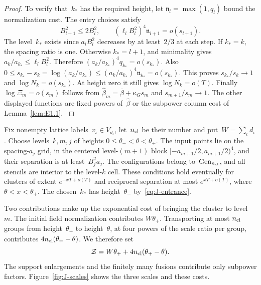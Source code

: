 \begin{proof}
To verify that~$k_*$ has the required height, let $\mathfrak n_l=\max(1,q_l)$ bound the normalization cost. The entry choices satisfy
\begin{equation}\label{eq:J-entrance}
B_{l+1}^2\le2B_l^2,\qquad
(\ell_lB_l^2)^4\mathfrak n_{l+1}=o(s_{l+1}).
\end{equation}
The level~$k_*$ exists since $a_lB_l^2$ decreases by at least~$2/3$ at each step. If $k_*=k$, the spacing ratio is one. Otherwise $k_*=l+1$, and minimality gives $a_k/a_{k_*}\le\ell_lB_l^2$. Therefore $(a_k/a_{k_*})^4q_{k_*}=o(s_{k_*})$. Also
$0\le s_{k_*}-s_k=\log(a_k/a_{k_*})\le(a_k/a_{k_*})^4\mathfrak n_{k_*}=o(s_{k_*})$.
This proves $s_{k_*}/s_k\to1$ and $\log N_k=o(s_{k_*})$. At height zero it still gives $\log N_k=o(T)$. Finally~$\log \Xi_m=o(s_m)$ follows from $\widehat\beta_m=\bar\beta+\kappa_Gs_m$ and $s_{m+1}/s_m\to1$. The other displayed functions are fixed powers of~$\widehat\beta$ or the subpower column cost of Lemma~\ref{lem:E1.1}.
\label{proof:J-costs-end}
\end{proof}

Fix nonempty lattice labels~$v_\iota\in V_{d_\iota}$, let~$n_{\rm cl}$ be their number and put~$W=\sum_\iota d_\iota$. Choose levels~$k,m,j$ of heights $0\le \theta_-<\theta<\theta_+$. The input points lie on the spacing-$a_j$ grid, in the centered level-$(m+1)$ block $[-a_{m+1}/2,a_{m+1}/2)^4$, and their separation is at least~$B_j^2a_j$. The configurations belong to~$\mathrm{Gen}_{n_{\rm cl}}$, and all stencils are interior to the level-$k$ cell. These conditions hold eventually for clusters of extent $e^{-xT+o(T)}$ and reciprocal separation at most $e^{xT+o(T)}$, where $\theta<x<\theta_+$. The chosen~$k_*$ has height~$\theta_-$ by~\eqref{eq:J-entrance}.

Two contributions make up the exponential cost of bringing the cluster to level~$m$. The initial field normalization contributes $W\theta_+$. Transporting at most $n_{\rm cl}$ groups from height~$\theta_+$ to height~$\theta$, at four powers of the scale ratio per group, contributes $4n_{\rm cl}(\theta_+-\theta)$. We therefore set
\begin{equation*}
\mathcal Z=W\theta_++4n_{\rm cl}(\theta_+-\theta).
\end{equation*}
The support enlargements and the finitely many fusions contribute only subpower factors. Figure~\ref{fig:J-scales} shows the three scales and these costs.

